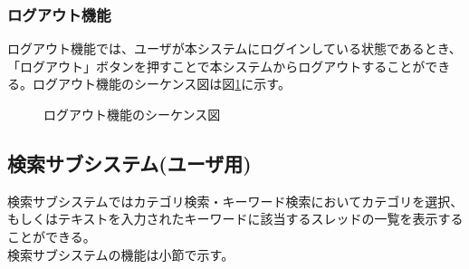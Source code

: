 \documentclass[a4j]{jarticle}
\begin{document}
  \subsubsection{ログアウト機能}
  ログアウト機能では、ユーザが本システムにログインしている状態であるとき、「ログアウト」ボタンを押すことで本システムからログアウトすることができる。ログアウト機能のシーケンス図は図\ref{fig:login_logout.png}に示す。
  \begin{figure}[H]
    \centering
    \caption{ログアウト機能のシーケンス図}
    \label{fig:login_logout.png}
  \end{figure}
  \subsection{検索サブシステム(ユーザ用)}
  検索サブシステムではカテゴリ検索・キーワード検索においてカテゴリを選択、もしくはテキストを入力されたキーワードに該当するスレッドの一覧を表示することができる。\\
  検索サブシステムの機能は小節で示す。
\end{document}
